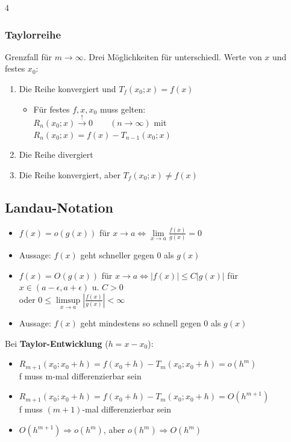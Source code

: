 \documentclass[6pt,a4paper]{scrartcl}
\newcommand{\abs}[1]{\ensuremath{\left\vert#1\right\vert}}
\begin{document}
\begin{multicols*}{4}
\begin{sectionbox}
		\subsubsection{Taylorreihe}
		Grenzfall für $m \rightarrow \infty$. Drei Möglichkeiten für unterschiedl. Werte von $x$ und festes $x_0$:
		\begin{enumerate}\itemsep0pt
			\item Die Reihe konvergiert und $T_f(x_0;x)=f(x)$ \begin{itemize}
				      \item Für festes $f,x,x_0$ muss gelten: \\$R_n(x_0;x)\overset{!}{\rightarrow }0 \qquad (n \rightarrow \infty)$ mit \\$R_n(x_0;x)=f(x)-T_{n-1}(x_0;x)$
			      \end{itemize}
			\item Die Reihe divergiert
			\item Die Reihe konvergiert, aber $T_f(x_0;x)\ne f(x)$
		\end{enumerate}
	\end{sectionbox}

	\subsection{Landau-Notation}
	\begin{sectionbox}
		\begin{itemize}\itemsep-1pt
			\item $f(x) = o(g(x))$ für $x \rightarrow a \Leftrightarrow \lim\limits_{x \rightarrow a} \frac{f(x)}{g(x)} = 0$
			\item[-] Aussage: $f(x)$ geht schneller gegen $0$ als $g(x)$
			\item $f(x) = O(g(x))$ für $x \rightarrow a \Leftrightarrow |f(x)| \leq C|g(x)|$ für $x \in (a - \epsilon, a + \epsilon)$ u. $C > 0$\\ oder $0 \leq \limsup\limits_{x \rightarrow a} \abs{\frac{f(x)}{g(x)}} < \infty$
			\item[-] Aussage: $f(x)$ geht mindestens so schnell gegen $0$ als $g(x)$
		\end{itemize}
	\end{sectionbox}

	Bei \textbf{Taylor-Entwicklung} ($h=x-x_0$):
	\begin{itemize}\itemsep-1pt
		\item $R_{m+1}(x_0;x_0+h) = f(x_0 + h) - T_{m}(x_0;x_0+h) = o(h^m)$\\ f muss m-mal differenzierbar sein
		\item $R_{m+1}(x_0;x_0+h) = f(x_0 + h) - T_{m}(x_0;x_0+h) = O(h^{m+1})$\\ f muss $(m+1)$-mal differenzierbar sein
		\item $O(h^{m+1}) \Rightarrow o(h^m)$, aber $o(h^m) \Rightarrow O(h^m)$
	\end{itemize}

\end{multicols*}
\end{document}
